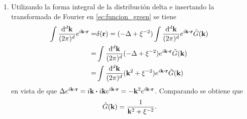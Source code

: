 \documentclass{article}
\begin{document}
\begin{enumerate}
\item Utilizando la forma integral de la distribución delta e insertando la transformada de Fourier en \eqref{ec:funcion_green} se tiene
\begin{align}
\begin{split}
\int\frac{\dd[d]{\vb{k}}}{(2\pi)^d}e^{i\vb{k}\vdot\vb{r}}=&\delta(\vb{r})=(-\Delta+\xi^{-2})\int\frac{\dd[d]{\vb{k}}}{(2\pi)^d}e^{i\vb{k}\vdot\vb{r}}\tilde{G}(\vb{k})\\
=&\int\frac{\dd[d]{\vb{k}}}{(2\pi)^d}(-\Delta+\xi^{-2})e^{i\vb{k}\vdot\vb{r}}\tilde{G}(\vb{k})\\
=&\int\frac{\dd[d]{\vb{k}}}{(2\pi)^d}(\vb{k}^2+\xi^{-2})e^{i\vb{k}\vdot\vb{r}}\tilde{G}(\vb{k})
\end{split}
\end{align}
en vista de que $\Delta e^{i\vb{k}\vdot\vb{r}}=i\vb{k}\vdot i\vb{k}e^{i\vb{k}\vdot\vb{r}}=-\vb{k}^2e^{i\vb{k}\vdot\vb{r}}$. Comparando se obtiene que 
\begin{equation}
\tilde{G}(\vb{k})=\frac{1}{\vb{k}^2+\xi^{-2}}.
\end{equation} 


\end{enumerate}
\end{document}
